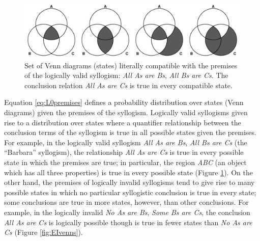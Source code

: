 \documentclass[floatsintext, doc]{apa6}
\begin{document}

\begin{figure}[b]
\centering
\includegraphics[width = \textwidth]{figs/diagrams_allAB_allBC.pdf}
\caption{Set of Venn diagrams (states) literally compatible with the premises of the logically valid syllogism: \emph{All As are Bs}, \emph{All Bs are Cs}. The conclusion relation \emph{All As are Cs} is true in every compatible state.}
\label{fig:AAvenns}
\end{figure}


Equation \ref{eq:L0premises} defines a probability distribution over states (Venn diagrams) given the premises of the syllogism. 
Logically valid syllogisms given rise to a distribution over states where a quantifier relationship between the conclusion terms of the syllogism is true in all possible states given the premises. 
For example, in the logically valid syllogism  \emph{All As are Bs}, \emph{All Bs are Cs} (the ``Barbara'' syllogism), the relationship \emph{All As are Cs} is true in every possible state in which the premises are true; in particular, the region \emph{ABC} (an object which has all three properties) is true in every possible state (Figure \ref{fig:AAvenns}).
On the other hand, the premises of logically invalid syllogisms tend to give rise to many possible states in which no particular syllogistic conclusion is true in every state; some conclusions are true in more states, however, than other conclusions.
For example, in the logically invalid \emph{No As are Bs}, \emph{Some Bs are Cs}, the conclusion \emph{All As are Cs} is logically possible though is true in fewer states than \emph{No As are Cs} (Figure \ref{fig:EIvenns}).
\end{document}

